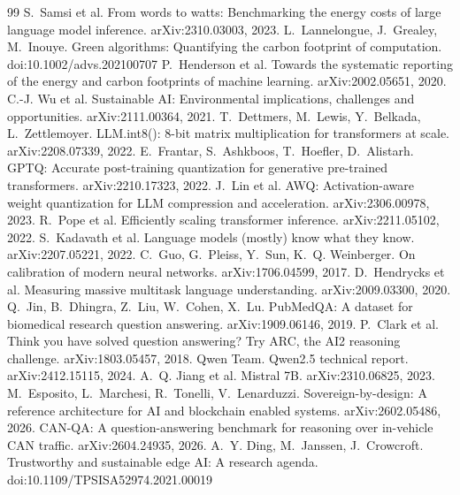 \begin{thebibliography}{99}
 S.~Samsi et al. From words to watts: Benchmarking the energy costs of large language model inference. arXiv:2310.03003, 2023.
 L.~Lannelongue, J.~Grealey, M.~Inouye. Green algorithms: Quantifying the carbon footprint of computation. doi:10.1002/advs.202100707
 P.~Henderson et al. Towards the systematic reporting of the energy and carbon footprints of machine learning. arXiv:2002.05651, 2020.
 C.-J. Wu et al. Sustainable AI: Environmental implications, challenges and opportunities. arXiv:2111.00364, 2021.
 T.~Dettmers, M.~Lewis, Y.~Belkada, L.~Zettlemoyer. LLM.int8(): 8-bit matrix multiplication for transformers at scale. arXiv:2208.07339, 2022.
 E.~Frantar, S.~Ashkboos, T.~Hoefler, D.~Alistarh. GPTQ: Accurate post-training quantization for generative pre-trained transformers. arXiv:2210.17323, 2022.
 J.~Lin et al. AWQ: Activation-aware weight quantization for LLM compression and acceleration. arXiv:2306.00978, 2023.
 R.~Pope et al. Efficiently scaling transformer inference. arXiv:2211.05102, 2022.
 S.~Kadavath et al. Language models (mostly) know what they know. arXiv:2207.05221, 2022.
 C.~Guo, G.~Pleiss, Y.~Sun, K.~Q. Weinberger. On calibration of modern neural networks. arXiv:1706.04599, 2017.
 D.~Hendrycks et al. Measuring massive multitask language understanding. arXiv:2009.03300, 2020.
 Q.~Jin, B.~Dhingra, Z.~Liu, W.~Cohen, X.~Lu. PubMedQA: A dataset for biomedical research question answering. arXiv:1909.06146, 2019.
 P.~Clark et al. Think you have solved question answering? Try ARC, the AI2 reasoning challenge. arXiv:1803.05457, 2018.
 Qwen Team. Qwen2.5 technical report. arXiv:2412.15115, 2024.
 A.~Q. Jiang et al. Mistral 7B. arXiv:2310.06825, 2023.
 M.~Esposito, L.~Marchesi, R.~Tonelli, V.~Lenarduzzi. Sovereign-by-design: A reference architecture for AI and blockchain enabled systems. arXiv:2602.05486, 2026.
 CAN-QA: A question-answering benchmark for reasoning over in-vehicle CAN traffic. arXiv:2604.24935, 2026.
 A.~Y. Ding, M.~Janssen, J.~Crowcroft. Trustworthy and sustainable edge AI: A research agenda. doi:10.1109/TPSISA52974.2021.00019
\end{thebibliography}
